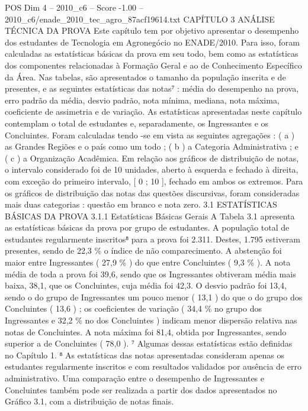 \begin{textsample}{POS Dim 4 – 2010\_c6 – Score -1.00 – 2010\_c6/enade\_2010\_tec\_agro\_87acf19614.txt}  \label{ex:f4_pos_312}
CAPÍTULO 3 ANÁLISE TÉCNICA DA PROVA Este capítulo tem por objetivo apresentar o desempenho dos estudantes de Tecnologia em Agronegócio no ENADE/2010.
Para isso, foram calculadas as estatísticas básicas da prova em seu todo, bem como as estatísticas dos componentes relacionadas à Formação Geral e ao de Conhecimento Específico da Área.
Nas tabelas, são apresentados o tamanho da população inscrita e de presentes, e as seguintes estatísticas das notas⁷ : média do desempenho na prova, erro padrão da média, desvio padrão, nota mínima, mediana, nota máxima, coeficiente de assimetria e de variação.
As estatísticas apresentadas neste capítulo contemplam o total de estudantes e, separadamente, os Ingressantes e os Concluintes.
Foram calculadas tendo -se em vista as seguintes agregações : ( a ) as Grandes Regiões e o país como um todo ; ( b ) a Categoria Administrativa ; e ( c ) a Organização Acadêmica.
Em relação aos gráficos de distribuição de notas, o intervalo considerado foi de 10 unidades, aberto à esquerda e fechado à direita, com exceção do primeiro intervalo, [ 0 ; 10 ], fechado em ambos os extremos.
Para os gráficos de distribuição das notas das questões discursivas, foram consideradas mais duas categorias : questão em branco e nota zero. 3.1 ESTATÍSTICAS BÁSICAS DA PROVA 3.1.1 Estatísticas Básicas Gerais A Tabela 3.1 apresenta as estatísticas básicas da prova por grupo de estudantes.
A população total de estudantes regularmente inscritos⁸ para a prova foi 2.311.
Destes, 1.795 estiveram presentes, sendo de 22,3 \% o índice de não comparecimento.
A abstenção foi maior entre Ingressantes ( 27,9 \% ) do que entre Concluintes ( 9,3 \% ).
A nota média de toda a prova foi 39,6, sendo que os Ingressantes obtiveram média mais baixa, 38,1, que os Concluintes, cuja média foi 42,3.
O desvio padrão foi 13,4, sendo o do grupo de Ingressantes um pouco menor ( 13,1 ) do que o do grupo dos Concluintes ( 13,6 ) ; os coeficientes de variação ( 34,4 \% no grupo dos Ingressantes e 32,2 \% no dos Concluintes ) indicam menor dispersão relativa nas notas de Concluintes.
A nota máxima foi 81,4, obtida por Ingressantes, sendo superior a de Concluintes ( 78,0 ). ⁷ Algumas dessas estatísticas estão definidas no Capítulo 1. ⁸ As estatísticas das notas apresentadas consideram apenas os estudantes regularmente inscritos e com resultados validados por ausência de erro administrativo.
Uma comparação entre o desempenho de Ingressantes e Concluintes também pode ser realizada a partir dos dados apresentados no Gráfico 3.1, com a distribuição de notas finais.

\end{textsample}
